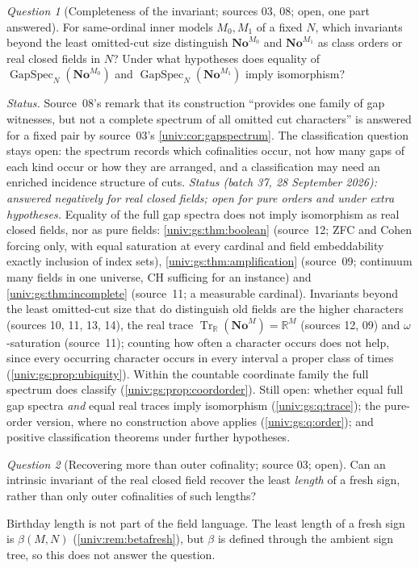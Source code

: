 \documentclass[11pt,letterpaper]{article}
\numberwithin{equation}{section}
\theoremstyle{definition}
\theoremstyle{remark}
\newtheorem{question}[question]{Question}
\newcommand{\No}{\mathbf{No}}
\newcommand{\NoM}{\No^{M}}
\newcommand{\R}{\mathbb R}
\newcommand{\GapSpec}{\operatorname{GapSpec}}
\newcommand{\Tr}{\operatorname{Tr}_{\R}}
\begin{document}
\begin{question}[Completeness of the invariant; sources 03, 08; open, one part answered]\label{univ:q:completeness}
For same-ordinal inner models $M_0,M_1$ of a fixed $N$, which invariants beyond
the least omitted-cut size distinguish $\No^{M_0}$ and $\No^{M_1}$ as class
orders or real closed fields in $N$? Under what hypotheses does equality of
$\GapSpec_N(\No^{M_0})$ and $\GapSpec_N(\No^{M_1})$ imply isomorphism?
\end{question}
\emph{Status.} Source~08's remark that its construction ``provides one family of
gap witnesses, but not a complete spectrum of all omitted cut characters'' is
answered for a fixed pair by source~03's \cref{univ:cor:gapspectrum}. The
classification question stays open: the spectrum records which cofinalities
occur, not how many gaps of each kind occur or how they are arranged, and a
classification may need an enriched incidence structure of cuts.
\emph{Status (batch 37, 28 September 2026): answered negatively for real closed
fields; open for pure orders and under extra hypotheses.} Equality of the full
gap spectra does not imply isomorphism as real closed fields, nor as pure fields:
\cref{univ:gs:thm:boolean} (source~12; ZFC and Cohen forcing only, with equal
saturation at every cardinal and field embeddability exactly inclusion of index
sets), \cref{univ:gs:thm:amplification} (source~09; continuum many fields in one
universe, CH sufficing for an instance) and \cref{univ:gs:thm:incomplete}
(source~11; a measurable cardinal). Invariants beyond the least omitted-cut size
that do distinguish old fields are the higher characters (sources 10, 11, 13, 14),
the real trace $\Tr(\NoM)=\R^M$ (sources 12, 09) and $\omega$-saturation
(source~11); counting how often a character occurs does not help, since every
occurring character occurs in every interval a proper class of times
(\cref{univ:gs:prop:ubiquity}). Within the countable coordinate family the full
spectrum does classify (\cref{univ:gs:prop:coordorder}). Still open: whether equal
full gap spectra \emph{and} equal real traces imply isomorphism
(\cref{univ:gs:q:trace}); the pure-order version, where no construction above
applies (\cref{univ:gs:q:order}); and positive classification theorems under
further hypotheses.

\begin{question}[Recovering more than outer cofinality; source 03; open]\label{univ:q:length}
Can an intrinsic invariant of the real closed field recover the least
\emph{length} of a fresh sign, rather than only outer cofinalities of such
lengths?
\end{question}
Birthday length is not part of the field language. The least length of a fresh
sign is $\beta(M,N)$ (\cref{univ:rem:betafresh}), but $\beta$ is defined through
the ambient sign tree, so this does not answer the question.
\end{document}
